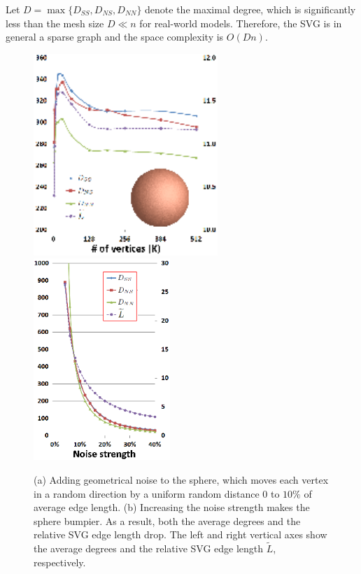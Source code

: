 Let $D=\max\{D_{SS},D_{NS},D_{NN}\}$ denote the maximal degree,
which is significantly less than the mesh size $D\ll n$ for
real-world models. Therefore, the SVG
is in general a sparse graph and the space complexity is $O(Dn)$.


\begin{figure}[htbp]\center
\includegraphics[height=3in]{figs/svg/sphere_01_without_vertical_labels.png}\hspace{0.05in}
\includegraphics[height=3in]{figs/svg/sphere_noise_strength_scaled.png}\\
  \vspace{-0.1in} \caption{(a)
Adding geometrical noise to the sphere, which moves each vertex in a
random direction by a uniform random distance $0$ to $10\%$ of
average edge length. (b) Increasing the noise strength makes the
sphere bumpier. As a result, both the average degrees and the
relative SVG edge length drop. The left and right vertical axes show
the average degrees and the relative SVG edge length
$\widetilde{L}$, respectively.} \label{fig:sphere}
\end{figure}

